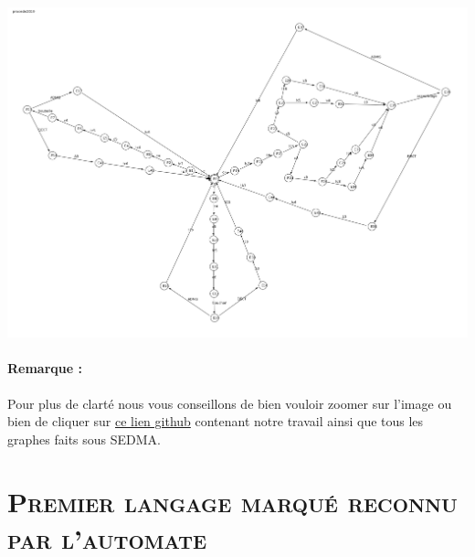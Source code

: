 		 	\begin{center}
			\includegraphics[scale=0.25]{procede.png}
			\label{fig3}
			\end{center} 
			\paragraph{Remarque :} Pour plus de clarté nous vous conseillons de bien vouloir zoomer sur l'image ou bien de cliquer sur \href{https://github.com/kherbicheali/SED\_report/tree/master/BCI\_SEDMA/}{ce lien github}  contenant notre travail ainsi que tous les graphes faits sous SEDMA. 
	
			\section{\textsc{Premier langage marqué reconnu par l'automate}}
			

